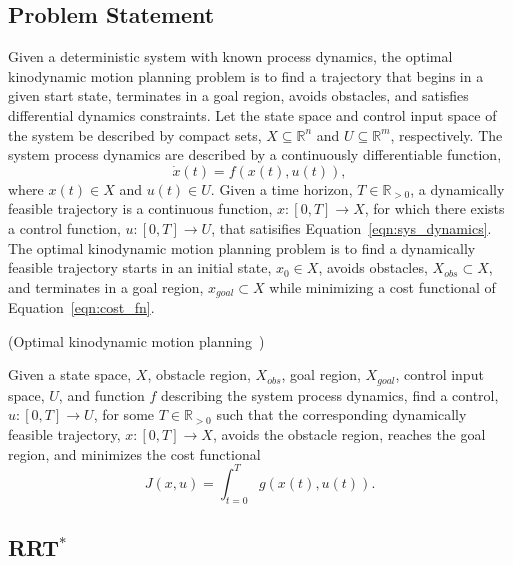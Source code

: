 
\subsection{Problem Statement}

Given a deterministic system with known process dynamics, the optimal
kinodynamic motion planning problem is to find a trajectory that
begins in a given start state, terminates in a goal region, avoids
obstacles, and satisfies differential dynamics constraints. Let the
state space and control input space of the system be described by
compact sets, $X \subseteq \mathbb{R}^n$ and $U \subseteq
\mathbb{R}^m$, respectively. The system process dynamics are described
by a continuously differentiable function,
\begin{equation}
\dot{x}(t) = f(x(t),u(t)),
\label{eqn:sys_dynamics}
\end{equation}
where $x(t) \in X$ and $u(t) \in U$. Given a time horizon, $T \in
\mathbb{R}_{>0}$, a dynamically feasible trajectory is a continuous
function, $x: [0,T] \to X$, for which there exists a control function,
$u:[0,T] \to U$, that satisifies Equation~\ref{eqn:sys_dynamics}. The
optimal kinodynamic motion planning problem is to find a dynamically
feasible trajectory starts in an initial state, $x_0 \in X$, avoids
obstacles, $X_{obs} \subset X$, and terminates in a goal region,
$x_{goal} \subset X$ while minimizing a cost functional of
Equation~\ref{eqn:cost_fn}.

\begin{problem}
\label{prob:1}
(Optimal kinodynamic motion planning~\cite{Karaman.Frazzoli:CDC10})

Given a state space, $X$, obstacle region, $X_{obs}$, goal region,
$X_{goal}$, control input space, $U$, and function $f$ describing the
system process dynamics, find a control, $u : [0,T] \to U$, for some $T
\in \mathbb{R}_{>0}$ such that the corresponding dynamically feasible
trajectory, $x : [0,T] \to X$, avoids the obstacle region, reaches the
goal region, and minimizes the cost functional
\begin{equation}
J(x,u) = \int_{t=0}^T g(x(t),u(t)).
\label{eqn:cost_fn}
\end{equation}

\end{problem}


\subsection{RRT$^*$}

